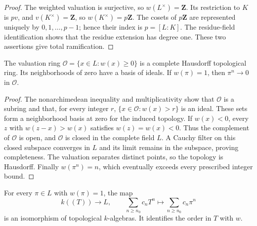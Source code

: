\begin{proof}
The weighted valuation is surjective, so $w(L^\times)=\mathbf Z$.
Its restriction to $K$ is $pv$, and $v(K^\times)=\mathbf Z$,
so $w(K^\times)=p\mathbf Z$. The cosets of $p\mathbf Z$
are represented uniquely by $0,1,\ldots,p-1$; hence their index
is $p=[L:K]$. The residue-field identification shows that the
residue extension has degree one. These two assertions give
total ramification.
\end{proof}

\begin{lemma}
\label{lem:artin-schreier-integer-topology}
\leanok
The valuation ring $\mathcal O=\{x\in L:w(x)\ge0\}$ is a complete
Hausdorff topological ring. Its neighborhoods of zero have a
basis of ideals. If $w(\pi)=1$, then $\pi^n\longrightarrow0$
in $\mathcal O$.
\end{lemma}

\begin{proof}
The nonarchimedean inequality and multiplicativity show that
$\mathcal O$ is a subring and that, for every integer $r$,
$\{x\in\mathcal O:w(x)>r\}$ is an ideal. These sets form a
neighborhood basis at zero for the induced topology.
If $w(x)<0$, every $z$ with $w(z-x)>w(x)$ satisfies
$w(z)=w(x)<0$. Thus the complement of $\mathcal O$ is open,
and $\mathcal O$ is closed in the complete field $L$.
A Cauchy filter on this closed subspace converges in $L$ and
its limit remains in the subspace, proving completeness.
The valuation separates distinct points, so the topology
is Hausdorff. Finally $w(\pi^n)=n$, which eventually exceeds
every prescribed integer bound.
\end{proof}

\begin{lemma}
\label{lem:artin-schreier-laurent-parameter}
\leanok
For every $\pi\in L$ with $w(\pi)=1$, the map
\[
 k((T))\longrightarrow L,\qquad
 \sum_{n\ge n_0}c_n T^n\longmapsto\sum_{n\ge n_0}c_n\pi^n
\]
is an isomorphism of topological $k$-algebras. It identifies
the order in $T$ with $w$.
\end{lemma}

